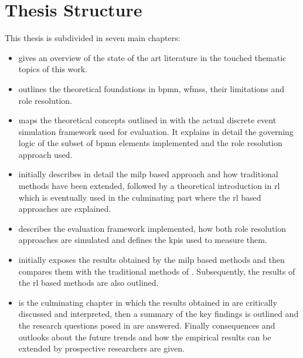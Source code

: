 \section{Thesis Structure}

This thesis is subdivided in seven main chapters:

\begin{itemize}
	\item {} gives an overview of the state of the art literature in the touched thematic topics of this work.
	\item {} outlines the theoretical foundations in \gls{bpmn}, \glspl{wfms}, their limitations and role resolution. 
	\item {} maps the theoretical concepts outlined in  with the actual discrete event simulation framework used for evaluation. It explains in detail the governing logic of the subset of \gls{bpmn} elements implemented and the role resolution approach used.
	\item {} initially describes in detail the \gls{milp} based approach and how traditional methods have been extended, followed by a theoretical introduction in \gls{rl} which is eventually used in the culminating part where the \gls{rl} based approaches are explained.
	\item {} describes the evaluation framework implemented, how both role resolution approaches are simulated and defines the \glspl{kpi} used to measure them.
	\item {} initially exposes the results obtained by the \gls{milp} based methods and then compares them with the traditional methods of \citet{Zeng2005}. Subsequently, the results of the \gls{rl} based methods are also outlined.
	\item {} is the culminating chapter in which the results obtained in  are critically discussed and interpreted, then	a summary of the key findings is outlined and the research questions posed in  are answered. Finally consequences and outlooks about the future trends and how the empirical results can be extended by prospective researchers are given.
\end{itemize}